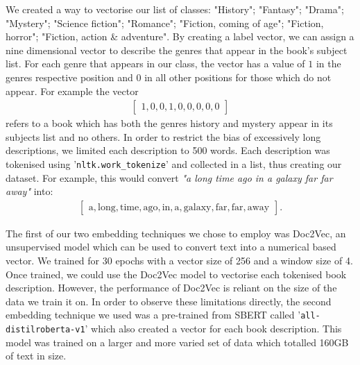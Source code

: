\documentclass[twocolumn,pra,floatfix]{revtex4-2}
\begin{document}
                We created a way to vectorise our list of classes: "History"; "Fantasy"; "Drama"; "Mystery"; "Science fiction"; "Romance"; "Fiction, coming of age"; "Fiction, horror"; "Fiction, action \& adventure". By creating a label vector, we can assign a nine dimensional vector to describe the genres that appear in the book's subject list. For each genre that appears in our class, the vector has a value of $1$ in the genres respective position and $0$ in all other positions for those which do not appear. For example the vector
                \begin{align*}
                    \begin{bmatrix}
                         1,0,0,1,0,0,0,0,0
                    \end{bmatrix}
                \end{align*}
                refers to a book which has both the genres history and mystery appear in its subjects list and no others. In order to restrict the bias of excessively long descriptions, we limited each description to 500 words. Each description was tokenised using '\texttt{nltk.work\_tokenize}'\cite{nltk} and collected in a list, thus creating our dataset. For example, this would convert \emph{"a long time ago in a galaxy far far away"} into:
                \begin{align*}
                    \begin{bmatrix}
                        \text{a},\text{long},\text{time},\text{ago},\text{in},\text{a},\text{galaxy},\text{far},\text{far},\text{away}
                    \end{bmatrix}.
                \end{align*}
                
                The first of our two embedding techniques we chose to employ was Doc2Vec\cite{doc2vec-paper}, an unsupervised model which can be used to convert text into a numerical based vector. We trained for $30$ epochs with a vector size of 256 and a window size of 4. Once trained, we could use the Doc2Vec model to vectorise each tokenised book description. However, the performance of Doc2Vec is reliant on the size of the data we train it on. In order to observe these limitations directly, the second embedding technique we used was a pre-trained from SBERT\cite{sbert_models} called '\texttt{all-distilroberta-v1}' which also created a vector for each book description. This model was trained on a larger and more varied set of data which totalled 160GB of text in size.
\end{document}
